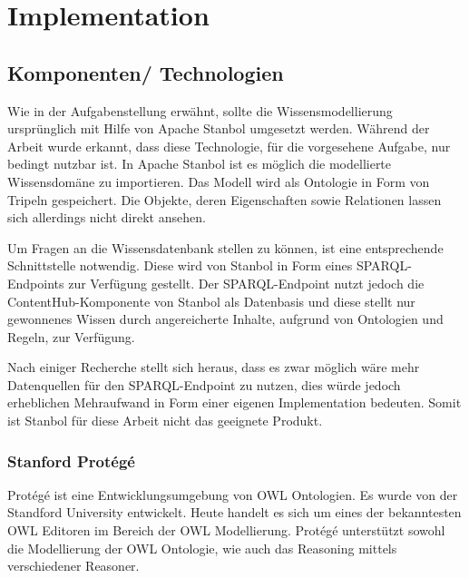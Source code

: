 \chapter{Implementation}
\label{chap:implementation}


\section{Komponenten/ Technologien}
\label{sec:komponenten}
Wie in der Aufgabenstellung erwähnt, sollte die Wissensmodellierung ursprünglich mit Hilfe von Apache Stanbol umgesetzt werden. Während der Arbeit wurde erkannt, dass diese Technologie, für die vorgesehene Aufgabe, nur bedingt nutzbar  ist. In Apache Stanbol ist es möglich die modellierte Wissensdomäne zu importieren. Das Modell wird als Ontologie in Form von Tripeln gespeichert. Die Objekte, deren Eigenschaften sowie Relationen lassen sich allerdings nicht direkt ansehen.

Um Fragen an die Wissensdatenbank stellen zu können, ist eine entsprechende Schnittstelle notwendig. Diese wird von Stanbol in Form eines SPARQL-Endpoints zur Verfügung gestellt. Der SPARQL-Endpoint nutzt jedoch die ContentHub-Komponente von Stanbol als Datenbasis und diese stellt nur gewonnenes Wissen durch angereicherte Inhalte, aufgrund von Ontologien und Regeln, zur Verfügung.

Nach einiger Recherche stellt sich heraus, dass es zwar möglich wäre mehr Datenquellen für den SPARQL-Endpoint zu nutzen, dies würde jedoch erheblichen Mehraufwand in Form einer eigenen Implementation bedeuten. Somit ist Stanbol für diese Arbeit nicht das geeignete Produkt.


\subsection{Stanford Protégé}
\label{subsec:protege}

Protégé ist eine Entwicklungsumgebung von OWL Ontologien. Es wurde von der Standford University entwickelt. Heute handelt es sich um  eines der bekanntesten OWL Editoren im Bereich der OWL Modellierung.
Protégé unterstützt sowohl die Modellierung der OWL Ontologie, wie auch das Reasoning mittels verschiedener Reasoner.


